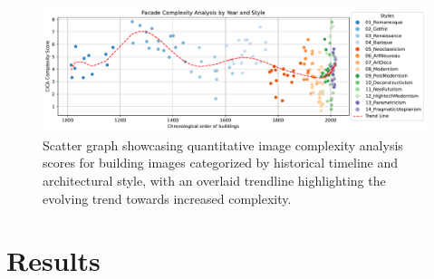 \documentclass[final,5p,times]{elsarticle}%
\begin{document}
\begin{linenumbers}
    \begin{figure}[htb]
          \centering
          \includegraphics[width= \linewidth]{Graphs/complexitygraph}
          \caption{Scatter graph showcasing quantitative image complexity analysis scores for building images categorized by historical timeline and architectural style, with an overlaid trendline highlighting the evolving trend towards increased complexity.}
          \label{fig:HistoricalComplexityGraph}
    \end{figure}


\section{Results}
\label{sec:Results}



\end{linenumbers}
\end{document}
